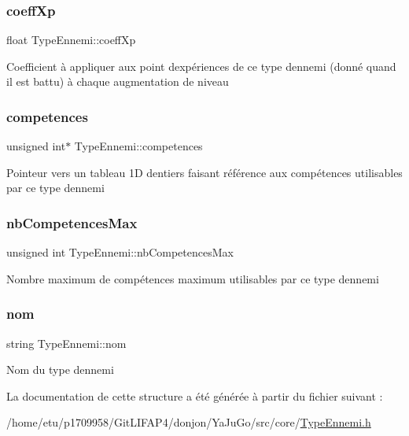 \subsubsection{\texorpdfstring{coeff\+Xp}{coeffXp}}
{\footnotesize\ttfamily float Type\+Ennemi\+::coeff\+Xp}

Coefficient à appliquer aux point d\textquotesingle{}expériences de ce type d\textquotesingle{}ennemi (donné quand il est battu) à chaque augmentation de niveau \mbox{\label{structTypeEnnemi_a701fbe7be31f5ca8f8850cf7b0de17ef}} 
\subsubsection{\texorpdfstring{competences}{competences}}
{\footnotesize\ttfamily unsigned int$\ast$ Type\+Ennemi\+::competences}

Pointeur vers un tableau 1D d\textquotesingle{}entiers faisant référence aux compétences utilisables par ce type d\textquotesingle{}ennemi \mbox{\label{structTypeEnnemi_a0123477dfc546083851d78214c947862}} 
\subsubsection{\texorpdfstring{nb\+Competences\+Max}{nbCompetencesMax}}
{\footnotesize\ttfamily unsigned int Type\+Ennemi\+::nb\+Competences\+Max}

Nombre maximum de compétences maximum utilisables par ce type d\textquotesingle{}ennemi \mbox{\label{structTypeEnnemi_ad74acff484556a90aeb2d7337bab02bb}} 
\subsubsection{\texorpdfstring{nom}{nom}}
{\footnotesize\ttfamily string Type\+Ennemi\+::nom}

Nom du type d\textquotesingle{}ennemi 

La documentation de cette structure a été générée à partir du fichier suivant \+:\begin{DoxyCompactItemize}
\item 
/home/etu/p1709958/\+Git\+L\+I\+F\+A\+P4/donjon/\+Ya\+Ju\+Go/src/core/\mbox{\hyperlink{TypeEnnemi_8h}{Type\+Ennemi.\+h}}\end{DoxyCompactItemize}

